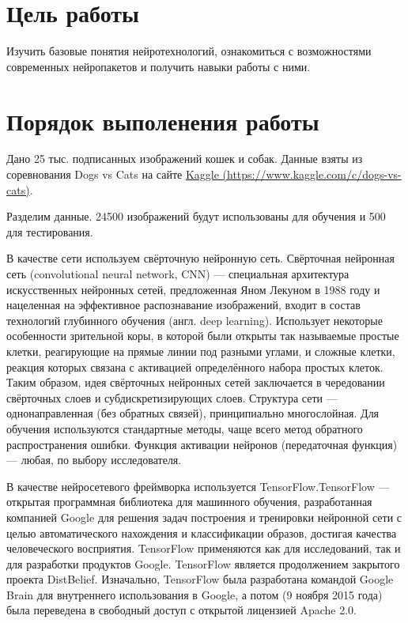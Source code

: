 	\section{Цель работы}
		Изучить базовые понятия нейротехнологий, ознакомиться с возможностями современных нейропакетов и получить навыки работы с ними.
	\section{Порядок выполенения работы}
		Дано 25 тыс. подписанных изображений кошек и собак. Данные взяты из соревнования Dogs vs Cats на сайте \href{https://www.kaggle.com/c/dogs-vs-cats}{Kaggle (https://www.kaggle.com/c/dogs-vs-cats)}.
			
		Разделим данные. 24500 изображений будут использованы для обучения и 500 для тестирования.
		
		В качестве сети используем свёрточную нейронную сеть. Свёрточная нейронная сеть (convolutional neural network, CNN) — специальная архитектура искусственных нейронных сетей, предложенная Яном Лекуном в 1988 году и нацеленная на эффективное распознавание изображений, входит в состав технологий глубинного обучения (англ. deep learning). Использует некоторые особенности зрительной коры, в которой были открыты так называемые простые клетки, реагирующие на прямые линии под разными углами, и сложные клетки, реакция которых связана с активацией определённого набора простых клеток. Таким образом, идея свёрточных нейронных сетей заключается в чередовании свёрточных слоев и субдискретизирующих слоев. Структура сети — однонаправленная (без обратных связей), принципиально многослойная. Для обучения используются стандартные методы, чаще всего метод обратного распространения ошибки. Функция активации нейронов (передаточная функция) — любая, по выбору исследователя.
			
		В качестве нейросетевого фреймворка используется TensorFlow.TensorFlow — открытая программная библиотека для машинного обучения, разработанная компанией Google для решения задач построения и тренировки нейронной сети с целью автоматического нахождения и классификации образов, достигая качества человеческого восприятия. TensorFlow применяются как для исследований, так и для разработки продуктов Google. TensorFlow является продолжением закрытого проекта DistBelief. Изначально, TensorFlow была разработана командой Google Brain для внутреннего использования в Google, а потом (9 ноября 2015 года) была переведена в свободный доступ с открытой лицензией Apache 2.0.
		

